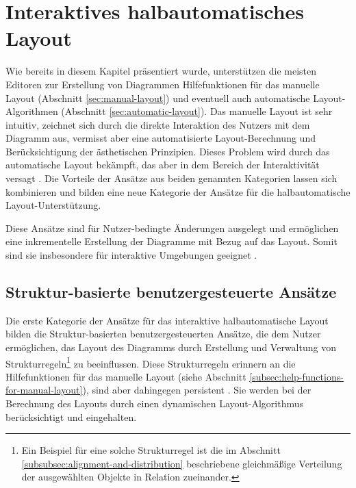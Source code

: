 \section{Interaktives halbautomatisches Layout}
\label{sec:interactive-semi-automatic-layout}

Wie bereits in diesem Kapitel präsentiert wurde, unterstützen die meisten Editoren zur Erstellung von Diagrammen Hilfefunktionen für das manuelle Layout (Abschnitt \ref{sec:manual-layout}) und eventuell auch automatische Layout-Algorithmen (Abschnitt \ref{sec:automatic-layout}). Das manuelle Layout ist sehr intuitiv, zeichnet sich durch die direkte Interaktion des Nutzers mit dem Diagramm aus, vermisst aber eine automatisierte Layout-Berechnung und Berücksichtigung der ästhetischen Prinzipien. Dieses Problem wird durch das automatische Layout bekämpft, das aber in dem Bereich der Interaktivität versagt \cite{GladischSchumann14Semi-Automatic}. Die Vorteile der Ansätze aus beiden genannten Kategorien lassen sich kombinieren und bilden eine neue Kategorie der Ansätze für die halbautomatische Layout-Unterstützung.

Diese Ansätze sind für Nutzer-bedingte Änderungen ausgelegt und ermöglichen eine inkrementelle Erstellung der Diagramme mit Bezug auf das Layout. Somit sind sie insbesondere für interaktive Umgebungen geeignet \cite{Arvo02Techniques, GladischSchumann14Semi-Automatic, Wybrow08Using}.



\subsection{Struktur-basierte benutzergesteuerte Ansätze}
\label{structure-based-user-controlled-approaches}

Die erste Kategorie der Ansätze für das interaktive halbautomatische Layout bilden die Struktur-basierten benutzergesteuerten Ansätze, die dem Nutzer ermöglichen, das Layout des Diagramms durch Erstellung und Verwaltung von Strukturregeln\footnote{Ein Beispiel für eine solche Strukturregel ist die im Abschnitt \ref{subsubsec:alignment-and-distribution} beschriebene gleichmäßige Verteilung der ausgewählten Objekte in Relation zueinander.} zu beeinflussen. Diese Strukturregeln erinnern an die Hilfefunktionen für das manuelle Layout (siehe Abschnitt \ref{subsec:help-functions-for-manual-layout}), sind aber dahingegen persistent \cite{Wybrow08Using}. Sie werden bei der Berechnung des Layouts durch einen dynamischen Layout-Algorithmus berücksichtigt und eingehalten.


